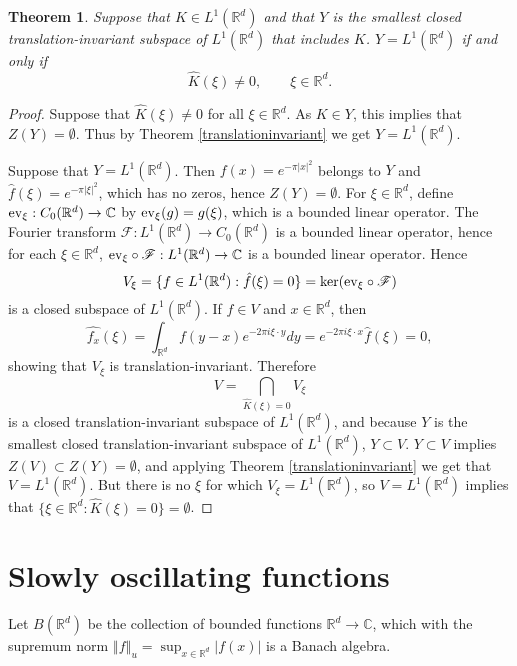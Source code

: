 \documentclass{article}
\newcommand{\ev}{\ensuremath\mathrm{ev}}
\newcommand{\norm}[1]{\left\Vert #1 \right\Vert}
\newtheorem{theorem}{Theorem}
\theoremstyle{definition}
\begin{document}
\begin{theorem}
Suppose that $K \in L^1(\mathbb{R}^d)$ and that $Y$ is the smallest closed translation-invariant  subspace of $L^1(\mathbb{R}^d)$ that includes $K$. $Y=L^1(\mathbb{R}^d)$ if and only
if 
\[
\hat{K}(\xi) \neq 0, \qquad \xi \in \mathbb{R}^d.
\]
\label{intersection}
\end{theorem}
\begin{proof}
Suppose that $\hat{K}(\xi) \neq 0$ for all $\xi \in \mathbb{R}^d$. As $K \in Y$, this implies that $Z(Y) = \emptyset$. Thus by
 Theorem \ref{translationinvariant} we get  $Y=L^1(\mathbb{R}^d)$.
 
 Suppose that $Y=L^1(\mathbb{R}^d)$. Then $f(x)=e^{-\pi |x|^2}$ belongs to $Y$ and $\hat{f}(\xi)=e^{-\pi |\xi|^2}$, which has no zeros,
 hence $Z(Y)=\emptyset$. For $\xi \in \mathbb{R}^d$, define $\ev_\xi:C_0(\mathbb{R}^d) \to \mathbb{C}$ by $\ev_\xi(g)=g(\xi)$, which
 is a bounded linear operator. The Fourier transform $\mathscr{F}:L^1(\mathbb{R}^d) \to C_0(\mathbb{R}^d)$ is a bounded linear operator, hence
 for each $\xi \in \mathbb{R}^d$, $\ev_\xi \circ \mathscr{F}:L^1(\mathbb{R}^d) \to \mathbb{C}$ is a bounded linear operator.
Hence
\[
V_\xi = \{f \in L^1(\mathbb{R}^d): \hat{f}(\xi)=0\} = \ker (\ev_\xi \circ \mathscr{F})
\]
 is a closed subspace of $L^1(\mathbb{R}^d)$. 
 If $f \in V$ and $x \in \mathbb{R}^d$, then
 \[
 \widehat{f_x}(\xi)=\int_{\mathbb{R}^d} f(y-x) e^{-2\pi i\xi\cdot y} dy = 
 e^{-2\pi i\xi \cdot x} \hat{f}(\xi)=0,
 \]
 showing that $V_\xi$ is translation-invariant.  
 Therefore
 \[
 V = \bigcap_{\hat{K}(\xi)=0} V_\xi
 \]
 is a closed translation-invariant subspace of $L^1(\mathbb{R}^d)$, and because $Y$ is the smallest closed translation-invariant 
 subspace of $L^1(\mathbb{R}^d)$, $Y \subset V$. $Y \subset V$ implies $Z(V) \subset Z(Y)=\emptyset$,
 and applying Theorem \ref{translationinvariant} we get that $V=L^1(\mathbb{R}^d)$. But  there
 is no $\xi$ for which $V_\xi = L^1(\mathbb{R}^d)$, so  $V=L^1(\mathbb{R}^d)$ implies that
 $\{\xi \in \mathbb{R}^d: \hat{K}(\xi)=0\}=\emptyset$. 
 \end{proof}


\section{Slowly oscillating functions}
Let $B(\mathbb{R}^d)$ be the collection of bounded functions $\mathbb{R}^d \to \mathbb{C}$, which with the supremum norm 
$\norm{f}_u = \sup_{x \in \mathbb{R}^d} |f(x)|$ is a Banach algebra.
\end{document}
